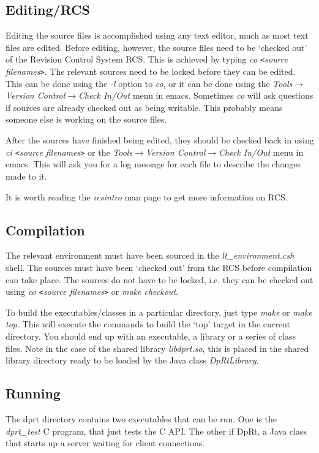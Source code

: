 \documentclass[10pt,a4paper]{article}
\begin{document}
\subsection{Editing/RCS}
Editing the source files is accomplished using any text editor, much as most text files are edited. Before 
editing, however, the source files need to be `checked out' of the Revision Control System RCS.
 This is achieved by typing
{\em co \verb'<'source filenames\verb'>'}. 
The relevant sources need to be locked before they can be edited. This can be done using the {\em -l} option to 
{\em co}, or it can be done using the {\em Tools$\rightarrow$Version Control$\rightarrow$Check In/Out} menu in emacs.
Sometimes {\em co} will ask questions if sources are already checked out as being
writable. This probably means someone else is working on the source files.

After the sources have finished being edited, they should be checked back in using {\em ci \verb'<'source filenames\verb'>'} or the {\em Tools$\rightarrow$Version Control$\rightarrow$Check In/Out} menu in emacs. This
will ask you for a log message for each file to describe the changes made to it.

It is worth reading the {\em rcsintro} man page to get more information on RCS.

\subsection{Compilation}
The relevant environment must have been sourced in the {\em lt\_environment.csh} shell. The sources must have been
`checked out' from the RCS before compilation can take place. The sources do not have to be locked, i.e. they can
be checked out using {\em co \verb'<'source filenames\verb'>'} or {\em make checkout}.

To build the executables/classes in a particular directory, just type {\em make} or {\em make top}. 
This will execute the commands
to build the `top' target in the current directory. You should end up with an executable, a library or a series
of class files. Note in the case of the shared library {\em libdprt.so}, this is placed in the shared library directory
ready to be loaded by the Java class {\em DpRtLibrary}.

\subsection{Running}
The dprt directory contains two executables that can be run. One is the {\em dprt\_test} C program, that just
tests the C API. The other if DpRt, a Java class that starts up a server waiting for client connections.
\end{document}
